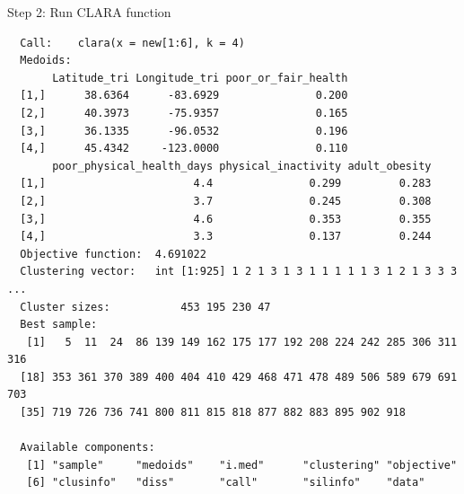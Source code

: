 \documentclass[12pt,twoside]{amherstthesis}
\begin{document}
  Step 2: Run CLARA function
  
  \begin{Shaded}
  \begin{Highlighting}[]
  \StringTok{ }\NormalTok{(new[}\OperatorTok{:}\NormalTok{], }\NormalTok{)}
  \end{Highlighting}
  \end{Shaded}
  
  \begin{Shaded}
  \begin{Highlighting}[]
  \end{Highlighting}
  \end{Shaded}
  
  \begin{verbatim}
  Call:    clara(x = new[1:6], k = 4) 
  Medoids:
       Latitude_tri Longitude_tri poor_or_fair_health
  [1,]      38.6364      -83.6929               0.200
  [2,]      40.3973      -75.9357               0.165
  [3,]      36.1335      -96.0532               0.196
  [4,]      45.4342     -123.0000               0.110
       poor_physical_health_days physical_inactivity adult_obesity
  [1,]                       4.4               0.299         0.283
  [2,]                       3.7               0.245         0.308
  [3,]                       4.6               0.353         0.355
  [4,]                       3.3               0.137         0.244
  Objective function:  4.691022
  Clustering vector:   int [1:925] 1 2 1 3 1 3 1 1 1 1 1 3 1 2 1 3 3 3 ...
  Cluster sizes:           453 195 230 47 
  Best sample:
   [1]   5  11  24  86 139 149 162 175 177 192 208 224 242 285 306 311 316
  [18] 353 361 370 389 400 404 410 429 468 471 478 489 506 589 679 691 703
  [35] 719 726 736 741 800 811 815 818 877 882 883 895 902 918
  
  Available components:
   [1] "sample"     "medoids"    "i.med"      "clustering" "objective" 
   [6] "clusinfo"   "diss"       "call"       "silinfo"    "data"      
  \end{verbatim}
  
  \begin{Shaded}
  \begin{Highlighting}[]
  \end{Highlighting}
  \end{Shaded}
  
\end{document}
